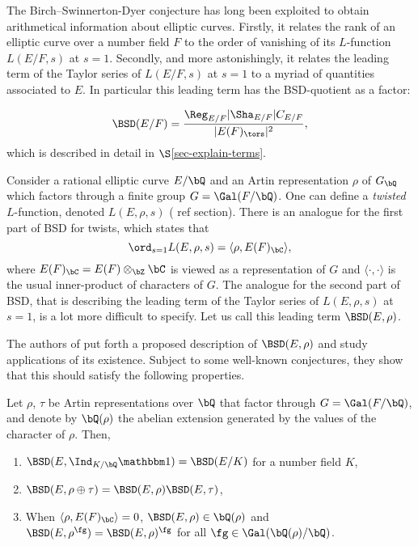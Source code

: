 The Birch--Swinnerton-Dyer conjecture has long been exploited to obtain arithmetical information about elliptic curves. Firstly, it relates the rank of an elliptic curve over a number field $F$ to the order of vanishing of its $L$-function $L(E / F, s)$ at $s = 1$. Secondly, and more astonishingly, it relates the leading term of the Taylor series of $L(E / F, s)$ at $s = 1$ to a myriad of quantities associated to $E$. In particular this leading term has the BSD-quotient as a factor:

\[
 \BSD(E / F) = \frac{\Reg_{E/F}|\Sha_{E/F}|C_{E/F}}{|E(F)_{\tors}|^2},
\]
which is described in detail in $\S$\ref{sec-explain-terms}.

Consider a rational elliptic curve $E / \bQ$ and an Artin representation $\rho$ of $G_{\bQ}$ which factors through a finite group $G = \Gal(F / \bQ)$. One can define a \textit{twisted} $L$-function, denoted $L(E, \rho, s)$ ({\color{red} ref section}). There is an analogue for the first part of BSD for twists, which states that 
\[ \ord_{s = 1} L(E, \rho, s) = \langle \rho, E(F)_{\bC} \rangle, \]
where $E(F)_{\bC} = E(F) \otimes_{\bZ} \bC$ is viewed as a representation of $G$ and $\langle \cdot , \cdot \rangle$ is the usual inner-product of characters of $G$. The analogue for the second part of BSD, that is describing the leading term of the Taylor series of $L(E, \rho, s)$ at $s = 1$, is a lot more difficult to specify. Let us call this leading term $\BSD(E, \rho)$.

The authors of \cite{DEW1} put forth a proposed description of $\BSD(E, \rho)$ and study applications of its existence. Subject to some well-known conjectures, they show that this should satisfy the following properties.

\begin{conj*}[ = Conjecture \ref{conj_4}, {\cite[Conjecture 4]{DEW1}})]\label{intro-conj_4}
    Let $\rho$, $\tau$ be Artin representations over $\bQ$ that factor through $G = \Gal(F / \bQ)$, and denote by $\bQ(\rho)$ the abelian extension generated by the values of the character of $\rho$. Then,
\begin{enumerate}
    \setlength\itemsep{0em}
    \item $\BSD(E, \Ind_{K / \bQ} \trivial) = \BSD(E / K)$ for a number field $K$,
    \item $\BSD(E, \rho \oplus \tau ) = \BSD(E, \rho)\BSD(E, \tau)$,
    \item When $\langle \rho, E(F)_{\bC} \rangle = 0$, $\BSD(E, \rho) \in \bQ(\rho)$ and $\BSD(E, \rho^{\fg}) = \BSD(E, \rho)^{\fg}$ for all $\fg \in \Gal(\bQ(\rho) / \bQ)$. 
\end{enumerate}
\end{conj*}

